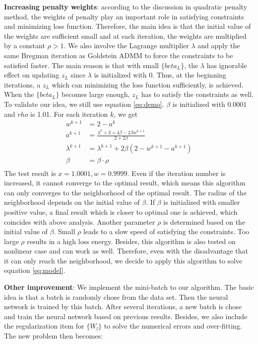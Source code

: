\documentclass[letterpaper, 10 pt, conference]{ieeeconf}  %
\begin{document}
\textbf{Increasing penalty weights}: according to the discussion in quadratic penalty method, the weights of penalty play an important role in satisfying constraints and minimizing loss function. Therefore, the main idea is that the initial value of the weights are sufficient small and at each iteration, the weights are multiplied by a constant $\rho>1$. We also involve the Lagrange multiplier $\lambda$ and apply the same Bregman iteration as Goldstein ADMM to force the constraints to be satisfied faster. The main reason is that with small $\{beta_L\}$, the $\lambda$ has ignorable effect on updating $z_L$ since $\lambda$ is initialized with 0. Thus, at the beginning iterations, a $z_L$ which can minimizing the loss function sufficiently, is achieved. When the $\{beta_L\}$ becomes large enough, $z_L$ has to satisfy the constraints as well. To validate our idea, we still use equation \eqref{eq:demo}. $\beta$ is initialized with 0.0001 and $rho$ is 1.01. For each iteration $k$, we get
\begin{equation}
\begin{aligned}
w^{k+1} &= 2-a^k \\
a^{k+1} &= \frac{\lambda^k+2+4\beta-2\beta w^{k+1}}{2+2\beta}\\
\lambda^{k+1} &= \lambda^{k+1} + 2\beta(2-w^{k+1}-a^{k+1})\\
\beta &= \beta \cdot \rho \\
\end{aligned}
\label{eq:demoupdate}
\end{equation}
The test result is $x=1.0001, w=0.9999$. Even if the iteration number is increased, it cannot converge to the optimal result, which means this algorithm can only converges to the neighborhood of the optimal result. The radius of the neighborhood depends on the initial value of $\beta$. If $\beta$ is initialized with smaller positive value, a final result which is closer to optimal one is achieved, which coincides with above analysis. Another parameter $\rho$ is determined based on the initial value of $\beta$. Small $\rho$ leads to a slow speed of satisfying the constraints. Too large $\rho$ results in a high loss energy. Besides, this algorithm is also tested on nonlinear case and can work as well. Therefore, even with the disadvantage that it can only reach the neighborhood, we decide to apply this algorithm to solve equation \eqref{eq:model}.



\textbf{Other improvement}: We implement the mini-batch to our algorithm. The basic idea is that a batch is randomly chose from the data set. Then the neural network is trained by this batch. After several iterations, a new batch is chose and train the neural network based on previous results. Besides, we also include the regularization item for $\{W_l\}$ to solve the numerical errors and over-fitting. The new problem then becomes:
\end{document}
